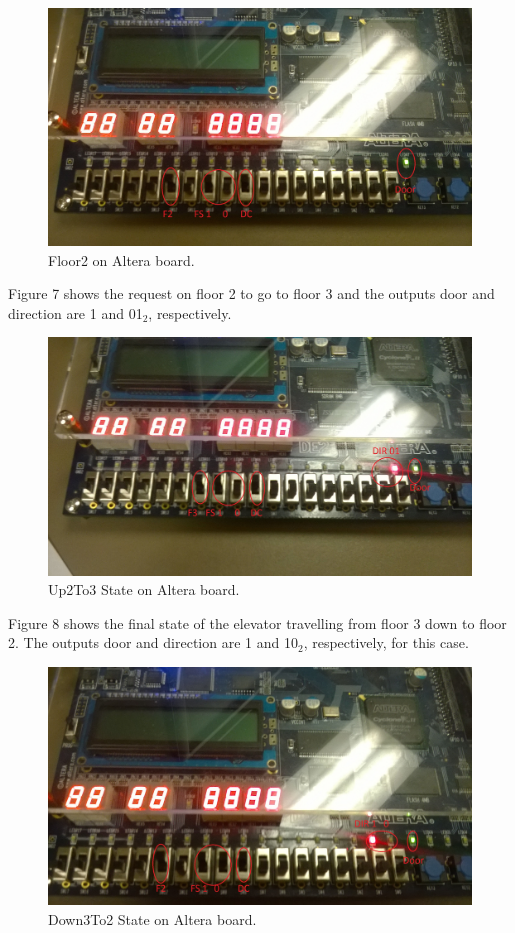 \documentclass[journal]{IEEEtran}
\begin{document}
\begin{figure}[h]
\centering
\includegraphics[width=0.9\linewidth]{Floor2.jpg}
\caption{Floor2 on Altera board.}
\label{floor2}
\end{figure}

Figure 7 shows the request on floor 2 to go to floor 3 and the outputs door and direction are 1 and 01$_{2}$, respectively. 

\begin{figure}[h]
\centering
\includegraphics[width=0.9\linewidth]{Up2To3.jpg}
\caption{Up2To3 State on Altera board.}
\label{up2to3}
\end{figure}

Figure 8 shows the final state of the elevator travelling from floor 3 down to floor 2. The outputs door and direction are 1 and 10$_{2}$, respectively, for this case.

\begin{figure}[h]
\centering
\includegraphics[width=0.9\linewidth]{Down3To2.jpg}
\caption{Down3To2 State on Altera board.}
\label{down3to2}
\end{figure}
\end{document}
